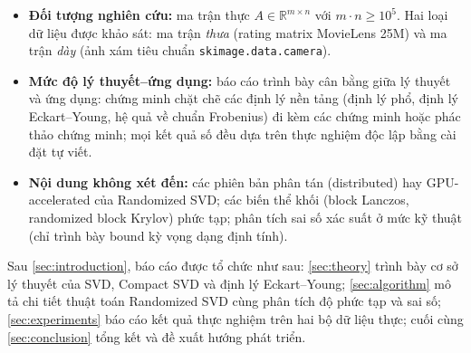 \begin{itemize}
    \item \textbf{Đối tượng nghiên cứu:} ma trận thực
    $A \in \mathbb{R}^{m\times n}$ với $m \cdot n \ge 10^5$. Hai loại
    dữ liệu được khảo sát: ma trận \emph{thưa} (rating matrix MovieLens 25M)
    và ma trận \emph{dày} (ảnh xám tiêu chuẩn \texttt{skimage.data.camera}).

    \item \textbf{Mức độ lý thuyết--ứng dụng:} báo cáo trình bày cân bằng giữa
    lý thuyết và ứng dụng: chứng minh chặt chẽ các định lý nền tảng (định lý
    phổ, định lý Eckart--Young, hệ quả về chuẩn Frobenius) đi kèm các
    chứng minh hoặc phác thảo chứng minh; mọi kết quả số đều dựa trên thực
    nghiệm độc lập bằng cài đặt tự viết.

    \item \textbf{Nội dung không xét đến:} các phiên bản phân tán
    (distributed) hay GPU-accelerated của Randomized SVD; các biến thể khối
    (block Lanczos, randomized block Krylov) phức tạp; phân tích sai số xác
    suất ở mức kỹ thuật (chỉ trình bày bound kỳ vọng dạng định tính).
\end{itemize}

Sau \cref{sec:introduction}, báo cáo được tổ chức như sau: \cref{sec:theory}
trình bày cơ sở lý thuyết của SVD, Compact SVD và định lý Eckart--Young;
\cref{sec:algorithm} mô tả chi tiết thuật toán Randomized SVD cùng phân tích
độ phức tạp và sai số; \cref{sec:experiments} báo cáo kết quả thực nghiệm
trên hai bộ dữ liệu thực; cuối cùng \cref{sec:conclusion} tổng kết và đề xuất
hướng phát triển.
